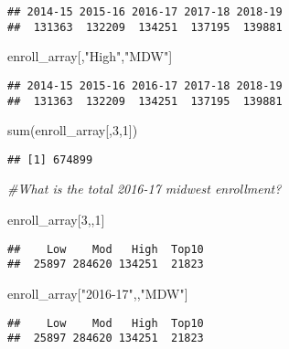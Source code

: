 \documentclass[
]{article}
\newenvironment{Shaded}{\begin{snugshade}}{\end{snugshade}}
\newcommand{\CommentTok}[1]{\textcolor[rgb]{0.56,0.35,0.01}{\textit{#1}}}
\newcommand{\DecValTok}[1]{\textcolor[rgb]{0.00,0.00,0.81}{#1}}
\newcommand{\FunctionTok}[1]{\textcolor[rgb]{0.00,0.00,0.00}{#1}}
\newcommand{\NormalTok}[1]{#1}
\newcommand{\StringTok}[1]{\textcolor[rgb]{0.31,0.60,0.02}{#1}}
\begin{document}
\begin{verbatim}
## 2014-15 2015-16 2016-17 2017-18 2018-19 
##  131363  132209  134251  137195  139881
\end{verbatim}

\begin{Shaded}
\begin{Highlighting}[]
\NormalTok{enroll\_array[,}\StringTok{"High"}\NormalTok{,}\StringTok{"MDW"}\NormalTok{]}
\end{Highlighting}
\end{Shaded}

\begin{verbatim}
## 2014-15 2015-16 2016-17 2017-18 2018-19 
##  131363  132209  134251  137195  139881
\end{verbatim}

\begin{Shaded}
\begin{Highlighting}[]
\FunctionTok{sum}\NormalTok{(enroll\_array[,}\DecValTok{3}\NormalTok{,}\DecValTok{1}\NormalTok{])}
\end{Highlighting}
\end{Shaded}

\begin{verbatim}
## [1] 674899
\end{verbatim}

\begin{Shaded}
\begin{Highlighting}[]
\CommentTok{\#What is the total 2016{-}17 midwest enrollment? }

\NormalTok{enroll\_array[}\DecValTok{3}\NormalTok{,,}\DecValTok{1}\NormalTok{]}
\end{Highlighting}
\end{Shaded}

\begin{verbatim}
##    Low    Mod   High  Top10 
##  25897 284620 134251  21823
\end{verbatim}

\begin{Shaded}
\begin{Highlighting}[]
\NormalTok{enroll\_array[}\StringTok{"2016{-}17"}\NormalTok{,,}\StringTok{"MDW"}\NormalTok{]}
\end{Highlighting}
\end{Shaded}

\begin{verbatim}
##    Low    Mod   High  Top10 
##  25897 284620 134251  21823
\end{verbatim}
\end{document}
